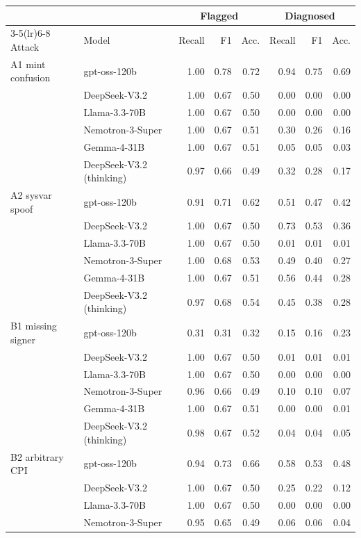 \begin{tabular}{llrrrrrr}
\toprule
 & & \multicolumn{3}{c}{Flagged} & \multicolumn{3}{c}{Diagnosed} \\
\cmidrule(lr){3-5}\cmidrule(lr){6-8}
Attack & Model & Recall & F1 & Acc. & Recall & F1 & Acc. \\
\midrule
A1 mint confusion & gpt-oss-120b & 1.00 & 0.78 & 0.72 & 0.94 & 0.75 & 0.69 \\
 & DeepSeek-V3.2 & 1.00 & 0.67 & 0.50 & 0.00 & 0.00 & 0.00 \\
 & Llama-3.3-70B & 1.00 & 0.67 & 0.50 & 0.00 & 0.00 & 0.00 \\
 & Nemotron-3-Super & 1.00 & 0.67 & 0.51 & 0.30 & 0.26 & 0.16 \\
 & Gemma-4-31B & 1.00 & 0.67 & 0.51 & 0.05 & 0.05 & 0.03 \\
 & DeepSeek-V3.2 (thinking) & 0.97 & 0.66 & 0.49 & 0.32 & 0.28 & 0.17 \\
\midrule
A2 sysvar spoof & gpt-oss-120b & 0.91 & 0.71 & 0.62 & 0.51 & 0.47 & 0.42 \\
 & DeepSeek-V3.2 & 1.00 & 0.67 & 0.50 & 0.73 & 0.53 & 0.36 \\
 & Llama-3.3-70B & 1.00 & 0.67 & 0.50 & 0.01 & 0.01 & 0.01 \\
 & Nemotron-3-Super & 1.00 & 0.68 & 0.53 & 0.49 & 0.40 & 0.27 \\
 & Gemma-4-31B & 1.00 & 0.67 & 0.51 & 0.56 & 0.44 & 0.28 \\
 & DeepSeek-V3.2 (thinking) & 0.97 & 0.68 & 0.54 & 0.45 & 0.38 & 0.28 \\
\midrule
B1 missing signer & gpt-oss-120b & 0.31 & 0.31 & 0.32 & 0.15 & 0.16 & 0.23 \\
 & DeepSeek-V3.2 & 1.00 & 0.67 & 0.50 & 0.01 & 0.01 & 0.01 \\
 & Llama-3.3-70B & 1.00 & 0.67 & 0.50 & 0.00 & 0.00 & 0.00 \\
 & Nemotron-3-Super & 0.96 & 0.66 & 0.49 & 0.10 & 0.10 & 0.07 \\
 & Gemma-4-31B & 1.00 & 0.67 & 0.51 & 0.00 & 0.00 & 0.01 \\
 & DeepSeek-V3.2 (thinking) & 0.98 & 0.67 & 0.52 & 0.04 & 0.04 & 0.05 \\
\midrule
B2 arbitrary CPI & gpt-oss-120b & 0.94 & 0.73 & 0.66 & 0.58 & 0.53 & 0.48 \\
 & DeepSeek-V3.2 & 1.00 & 0.67 & 0.50 & 0.25 & 0.22 & 0.12 \\
 & Llama-3.3-70B & 1.00 & 0.67 & 0.50 & 0.00 & 0.00 & 0.00 \\
 & Nemotron-3-Super & 0.95 & 0.65 & 0.49 & 0.06 & 0.06 & 0.04 \\

\end{tabular}
